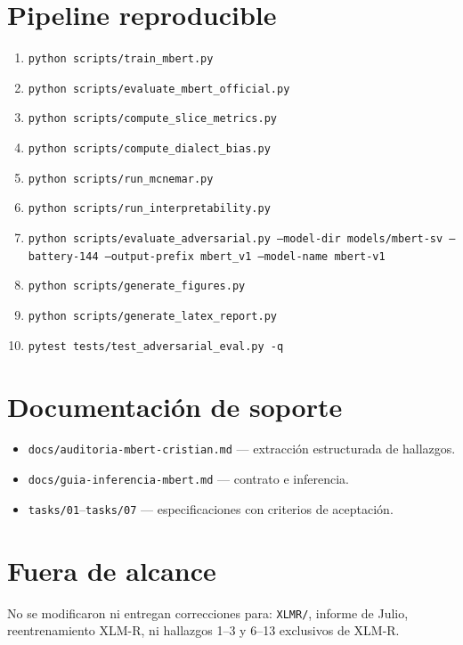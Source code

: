 \section{Pipeline reproducible}

\begin{enumerate}[noitemsep]
  \item \texttt{python scripts/train\_mbert.py}
  \item \texttt{python scripts/evaluate\_mbert\_official.py}
  \item \texttt{python scripts/compute\_slice\_metrics.py}
  \item \texttt{python scripts/compute\_dialect\_bias.py}
  \item \texttt{python scripts/run\_mcnemar.py}
  \item \texttt{python scripts/run\_interpretability.py}
  \item \texttt{python scripts/evaluate\_adversarial.py --model-dir models/mbert-sv --battery-144 --output-prefix mbert\_v1 --model-name mbert-v1}
  \item \texttt{python scripts/generate\_figures.py}
  \item \texttt{python scripts/generate\_latex\_report.py}
  \item \texttt{pytest tests/test\_adversarial\_eval.py -q}
\end{enumerate}

\section{Documentación de soporte}

\begin{itemize}[noitemsep]
  \item \texttt{docs/auditoria-mbert-cristian.md} --- extracción estructurada de hallazgos.
  \item \texttt{docs/guia-inferencia-mbert.md} --- contrato e inferencia.
  \item \texttt{tasks/01}--\texttt{tasks/07} --- especificaciones con criterios de aceptación.
\end{itemize}

\section{Fuera de alcance}

No se modificaron ni entregan correcciones para: \texttt{XLMR/}, informe de Julio, reentrenamiento XLM-R, ni hallazgos 1--3 y 6--13 exclusivos de XLM-R.
